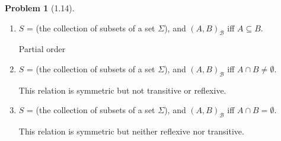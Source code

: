 \documentclass[12pt]{article}
\theoremstyle{definition}
\newtheorem{problem}{Problem}
\begin{document}
\begin{problem}[1.14]
\begin{enumerate}[label=(\alph*)]
        \item $S$ = (the collection of subsets of a set $\Sigma$), and $(A, B)_\mathcal{B}$ iff $A \subseteq B$.
        \begin{solution}

            Partial order
        \end{solution}
        
        \item $S$ = (the collection of subsets of a set $\Sigma$), and $(A, B)_\mathcal{B}$ iff $A \cap B \neq \emptyset$.
        \begin{solution}

            This relation is symmetric but not transitive or reflexive.
        \end{solution}
        
        \item $S$ = (the collection of subsets of a set $\Sigma$), and $(A, B)_\mathcal{B}$ iff $A \cap B = \emptyset$.
        \begin{solution}

            This relation is symmetric but neither reflexive nor transitive.
        \end{solution}
        
    \end{enumerate}
\end{problem}
\end{document}
